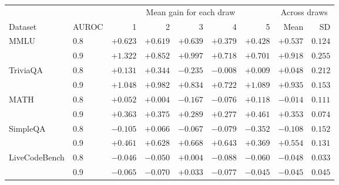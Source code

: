 \begin{tabular}{llrrrrrrr}
\toprule
& & \multicolumn{5}{c}{Mean gain for each draw} & \multicolumn{2}{c}{Across draws} \\
\cmidrule(lr){3-7}\cmidrule(lr){8-9}
Dataset & AUROC & 1 & 2 & 3 & 4 & 5 & Mean & SD \\
\midrule
MMLU & 0.8 & $+0.623$ & $+0.619$ & $+0.639$ & $+0.379$ & $+0.428$ & $+0.537$ & $0.124$ \\
 & 0.9 & $+1.322$ & $+0.852$ & $+0.997$ & $+0.718$ & $+0.701$ & $+0.918$ & $0.255$ \\
\addlinespace[2pt]
TriviaQA & 0.8 & $+0.131$ & $+0.344$ & $-0.235$ & $-0.008$ & $+0.009$ & $+0.048$ & $0.212$ \\
 & 0.9 & $+1.048$ & $+0.982$ & $+0.834$ & $+0.722$ & $+1.089$ & $+0.935$ & $0.153$ \\
\addlinespace[2pt]
MATH & 0.8 & $+0.052$ & $+0.004$ & $-0.167$ & $-0.076$ & $+0.118$ & $-0.014$ & $0.111$ \\
 & 0.9 & $+0.363$ & $+0.375$ & $+0.289$ & $+0.277$ & $+0.461$ & $+0.353$ & $0.074$ \\
\addlinespace[2pt]
SimpleQA & 0.8 & $-0.105$ & $+0.066$ & $-0.067$ & $-0.079$ & $-0.352$ & $-0.108$ & $0.152$ \\
 & 0.9 & $+0.461$ & $+0.628$ & $+0.668$ & $+0.643$ & $+0.369$ & $+0.554$ & $0.131$ \\
\addlinespace[2pt]
LiveCodeBench & 0.8 & $-0.046$ & $-0.050$ & $+0.004$ & $-0.088$ & $-0.060$ & $-0.048$ & $0.033$ \\
 & 0.9 & $-0.065$ & $-0.070$ & $+0.033$ & $-0.077$ & $-0.045$ & $-0.045$ & $0.045$ \\
\bottomrule
\end{tabular}
